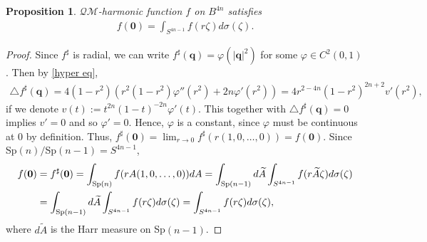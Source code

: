 \documentclass[a4paper,11pt]{amsart}
\numberwithin{equation}{section}
\newtheorem{prop}{Proposition}[section]
\begin{document}
\begin{prop}
$\mathcal{QM}$-harmonic function $f$ on $B^{4n}$ satisfies
\begin{equation}\begin{aligned}\label{m harmonic mv}
f(\mathbf{0})=\int_{S^{4n-1}} f(r\zeta)d\sigma(\zeta).
\end{aligned}\end{equation}
\end{prop}
\begin{proof}

Since $f^{\sharp}$ is radial, we can write $f^{\sharp}(\mathbf{q})=\varphi(|\mathbf{q}|^2)$ for some $\varphi\in C^2(0,1)$. Then by \eqref{hyper eq},
\begin{equation}\begin{aligned}\label{qe 1}
\triangle f^{\sharp}(\mathbf{q})=4(1-r^2)(r^2(1-r^2)\varphi''(r^2)+2n\varphi'(r^2))=4r^{2-4n}(1-r^2)^{2n+2}v'(r^2),
\end{aligned}\end{equation}
if we denote $v(t):=t^{2n}(1-t)^{-2n}\varphi'(t)$. This together with $\triangle f^{\sharp}(\mathbf{q})=0$ implies $v'=0$ and so $\varphi'=0$.
Hence, $\varphi$ is a constant, since $\varphi$ must be continuous at $0$ by definition. Thus, $f^{\sharp}(\mathbf{0})=\lim_{r\rightarrow 0}f^{\sharp}(r(1,0,\dots,0))=f(\mathbf{0})$.
Since Sp$(n)/$Sp$(n-1)=S^{4n-1}$,
\begin{equation}\begin{aligned}\label{int S}
f(\mathbf{0})&=f^{\sharp}(\mathbf{0})=\int_{{\rm Sp}(n)} f(r A(1,0,\dots,0))dA=\int_{{\rm Sp}(n-1)}d\widetilde{A}\int_{S^{4n-1}} f(r\widetilde{A}\zeta)d\sigma(\zeta)\\
&=\int_{{\rm Sp}(n-1)}d\widetilde{A}\int_{S^{4n-1}} f(r\zeta)d\sigma(\zeta)=\int_{S^{4n-1}} f(r\zeta)d\sigma(\zeta),
\end{aligned}\end{equation}
where $d\widetilde{A}$ is the Harr measure on Sp$(n-1)$.
\end{proof}
\end{document}
